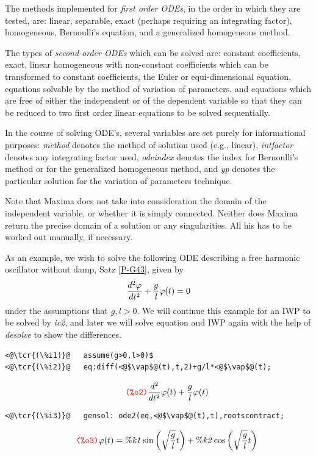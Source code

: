 \documentclass[../Maxima_Workbook.tex]{subfiles}
\begin{document}
\lz The methods implemented for \emph{first order ODEs}, in the order in which they are tested, are: linear, separable, exact (perhaps requiring an integrating factor), homogeneous, Bernoulli’s equation, and a generalized homogeneous method. 

\lz The types of \emph{second-order ODEs} which can be solved are: constant coefficients, exact, linear homogeneous with non-constant coefficients which can be transformed to constant coefficients, the Euler or equi-dimensional equation, equations solvable by the method of variation of parameters, and equations which are free of either the independent or of the dependent variable so that they can be reduced to two first order linear equations to be solved sequentially.

\lz In the course of solving ODE’s, several variables are set purely for informational purposes: \emph{method} denotes the method of solution used (e.g., linear), \emph{intfactor} denotes any integrating factor used, \emph{odeindex} denotes the index for Bernoulli’s method or for the generalized homogeneous method, and \emph{yp} denotes the particular solution for the variation of parameters technique.

\lz Note that Maxima does not take into consideration the domain of the independent variable, or whether it is simply connected. Neither does Maxima return the precise domain of a solution or any singularities. All his has to be worked out manually, if necessary.

\lz As an example, we wish to solve the following ODE describing a free harmonic oscillator without damp, Satz \ref{P-G43}, given by
\begin{equation}\label{DE4}
	\frac{d^2\varphi}{dt^2} + \frac{g}{l} \varphi(t)=0
\end{equation}
under the assumptions that $ g, l >0 $. We will continue this example for an IWP to be solved by \emph{ic2}, and later we will solve equation and IWP again with the help of \emph{desolve} to show the differences.

\lz \begin{small}
\color{blue} \leqn
\begin{lstlisting}
<@\tcr{(\%i1)}@   assume(g>0,l>0)$
<@\tcr{(\%i2)}@   eq:diff(<@$\vap$@(t),t,2)+g/l*<@$\vap$@(t);
\end{lstlisting}
\vspace{-5mm} \[\tag*{\tcr{\ttfamily (\%o2)}} \frac{{{d}^{2}}}{d {{t}^{2}}} \vap(t) +\frac{g}{l} \vap(t) \]
\vspace{-6mm} \begin{lstlisting}
<@\tcr{(\%i3)}@   gensol: ode2(eq,<@$\vap$@(t),t),rootscontract;
\end{lstlisting}
\vspace{-5mm} \[\tag*{\tcr{\ttfamily (\%o3)}} \vap(t) =\mathit{\% k1} \sin{\left( \sqrt{\frac{g}{l}} t\right) }+\mathit{\% k2} \cos{\left( \sqrt{\frac{g}{l}} t\right) } \]
\color{black} \reqn
\end{small}
\vspace{-2mm} 
\end{document}
